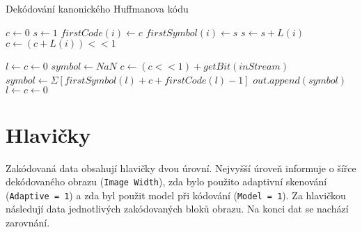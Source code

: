 \documentclass[a4paper, 11pt, fleqn]{scrartcl}
\begin{document}
        \begin{algorithm}[!h]
          \SetAlgoLined
          \DontPrintSemicolon
          \caption{Dekódování kanonického Huffmanova kódu}

          $c \leftarrow 0$\;
          $s \leftarrow 1$\;
          {
            $\textit{firstCode}(i) \leftarrow c$\;
            $\textit{firstSymbol}(i) \leftarrow s$\;
            $s \leftarrow s + L(i)$\;
            $c \leftarrow (c + L(i)) << 1$\;
          }

          $l \leftarrow c \leftarrow 0$\;
          $symbol \leftarrow NaN$\;
          {
            $c \leftarrow (c << 1) + getBit(inStream)$\;
            {
              $symbol \leftarrow \Sigma[firstSymbol(l) + c + firstCode(l) - 1]$\;
              {
                $out.append(symbol)$\;
              }
              $l \leftarrow c \leftarrow 0$\;
            }
          }

        \end{algorithm}

    \newpage

    \section{Hlavičky}
      Zakódovaná data obsahují hlavičky dvou úrovní. Nejvyšší úroveň informuje o šířce dekódovaného obrazu (\texttt{Image Width}), zda bylo použito adaptivní skenování (\texttt{Adaptive = 1}) a zda byl použit model při kódování (\texttt{Model~=~1}). Za hlavičkou následují data jednotlivých zakódovaných bloků obrazu. Na konci dat se nachází zarovnání.

      \vspace*{2em}
\end{document}
